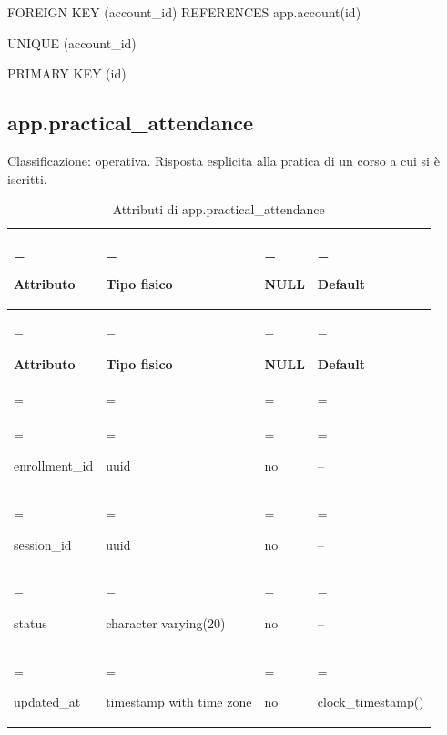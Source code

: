 \documentclass[11pt,a4paper]{article}
\begin{document}
{\ttfamily\small FOREIGN KEY (\allowbreak{}account\_\allowbreak{}id) REFERENCES app.\allowbreak{}account(\allowbreak{}id)}\par

{\ttfamily\small UNIQUE (\allowbreak{}account\_\allowbreak{}id)}\par

{\ttfamily\small PRIMARY KEY (\allowbreak{}id)}\par

\subsection{app.practical\_attendance}

Classificazione: operativa. Risposta esplicita alla pratica di un corso a cui si è iscritti.

{\small \renewcommand{\arraystretch}{1.2}

\begin{xltabular}{\linewidth}{>{\hsize\linewidth=\hsize\raggedright\arraybackslash}X>{\hsize\linewidth=\hsize\raggedright\arraybackslash}X>{\hsize\linewidth=\hsize\raggedright\arraybackslash}X>{\hsize\linewidth=\hsize\raggedright\arraybackslash}X}
\caption{Attributi di app.practical\_attendance}\label{tab:dictionary-18}\\
\toprule

\textbf{Attributo} & \textbf{Tipo fisico} & \textbf{NULL} & \textbf{Default}\\\midrule\endfirsthead\toprule\textbf{Attributo} & \textbf{Tipo fisico} & \textbf{NULL} & \textbf{Default}\\\midrule\endhead
\midrule{}\\\endfoot\bottomrule\endlastfoot


{\ttfamily\small enrollment\_\allowbreak{}id} & {\ttfamily\small uuid} & no & {\ttfamily\small --}\\\addlinespace[3pt]

{\ttfamily\small session\_\allowbreak{}id} & {\ttfamily\small uuid} & no & {\ttfamily\small --}\\\addlinespace[3pt]

{\ttfamily\small status} & {\ttfamily\small character varying(\allowbreak{}20)} & no & {\ttfamily\small --}\\\addlinespace[3pt]

{\ttfamily\small updated\_\allowbreak{}at} & {\ttfamily\small timestamp with time zone} & no & {\ttfamily\small clock\_\allowbreak{}timestamp(\allowbreak{})}\\*

\end{xltabular}}
\end{document}
